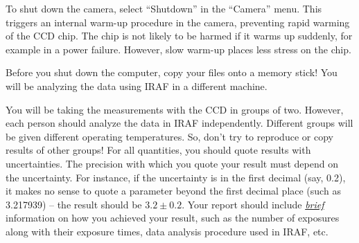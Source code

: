 \documentclass[a4paper,12pt]{article}
\begin{document}

To shut down the camera, select ``Shutdown'' in the ``Camera'' menu. This triggers an internal warm-up procedure in the camera, preventing rapid warming of the CCD chip. The chip is not likely to be harmed if it warms up suddenly, for example in a power failure. However, slow warm-up places less stress on the chip.

Before you shut down the computer, copy your files onto a memory stick! You will be analyzing the data using IRAF in a different machine.


You will be taking the measurements with the CCD in groups of two. However, each person should analyze the data in IRAF independently. Different groups will be given different operating temperatures. So, don't try to reproduce or copy results of other groups! For all quantities, you should quote results with uncertainties. The precision with which you quote your result must depend on the uncertainty. For instance, if the uncertainty is in the first decimal (say, 0.2), it makes no sense to quote a parameter beyond the first decimal place (such as 3.217939) -- the result should be $3.2 \pm 0.2$. Your report should include \underline{\it brief} information on how you achieved your result, such as the number of exposures along with their exposure times, data analysis procedure used in IRAF, etc.
\end{document}

